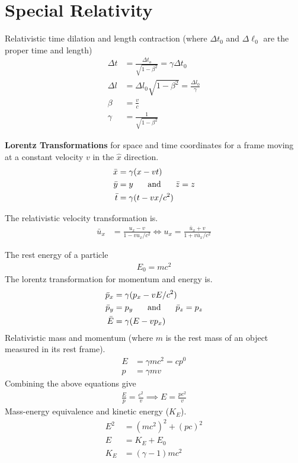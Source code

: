 \chapter{Special Relativity}
\thispagestyle{fancy}
\begin{multicols}{2}
Relativistic time dilation and length contraction (where $\Delta t_0$ and $\Delta \ell_0$ are the proper time and length)
\begin{align}
\Delta t &= \frac{\Delta t_o}{\sqrt{1-\beta^2}} = \gamma \Delta t_0 \\
\Delta l &= \Delta l_0 \sqrt{1 - \beta^2} = \frac{\Delta l_0}{\gamma} \\
\beta &= \frac{v}{c} \\
\gamma &= \frac{1}{\sqrt{1-\beta^2}}
\end{align}

\textbf{Lorentz Transformations} for space and time coordinates for a frame moving at a constant velocity $v$ in the $\hat{x}$ direction.
\begin{align}
\bar{x}&= \gamma(x-vt) \\
\bar{y}&=y \hspace{0.5cm}\textrm{ and }\hspace{0.5cm} \bar{z} = z \\
\bar{t}&= \gamma (t-vx/c^2)
\end{align}

The relativistic velocity transformation is.
\begin{align}
\bar{u}_x &= \frac{u_x-v}{1-vu_x/c^2} \Longleftrightarrow
u_x = \frac{\bar{u}_x+v}{1+v\bar{u}_x/c^2}
\end{align}

The rest energy of a particle
\begin{align}
E_0=mc^2
\end{align}
The lorentz transformation for momentum and energy is.
\begin{align}
\bar{p}_x &= \gamma(p_x-vE/c^2) \\
\bar{p}_y &= p_y \hspace{0.5cm}\textrm{ and }\hspace{0.5cm} \bar{p}_z = p_z \\
\bar{E} &= \gamma(E-vp_x)
\end{align}
Relativistic mass and momentum (where $m$ is the rest mass of an object measured in its rest frame).
\begin{align}
E &=\gamma mc^2 = c p^0 \\
p &= \gamma mv
\end{align}
Combining the above equations give 
\begin{align}
\frac{E}{p} = \frac{c^2}{v} \implies E=\frac{pc^2}{v}
\end{align}
Mass-energy equivalence and kinetic energy ($K_E$).
\begin{align}
E^2 &=(mc^2)^2 + (pc)^2 \\
E &= K_E + E_0 \\
K_E &= (\gamma - 1)mc^2 
\end{align}


\end{multicols}
